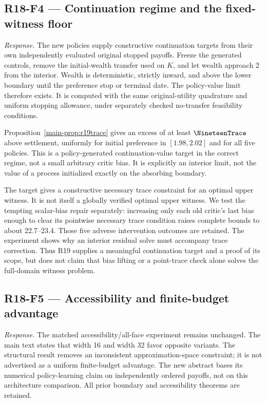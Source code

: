 \subsection{R18-F4 --- Continuation regime and the fixed-witness floor}
\emph{Response.} The new policies supply constructive continuation targets from their own independently evaluated original stopped payoffs. Freeze the generated controls, remove the initial-wealth transfer used on $K$, and let wealth approach 2 from the interior. Wealth is deterministic, strictly inward, and above the lower boundary until the preference stop or terminal date. The policy-value limit therefore exists. It is computed with the same original-utility quadrature and uniform stopping allowance, under separately checked no-transfer feasibility conditions.

Proposition~\ref{main-prop:r19trace} gives an excess of at least $\NineteenTrace$ above settlement, uniformly for initial preference in $[1.98,2.02]$ and for all five policies. This is a policy-generated continuation-value target in the correct regime, not a small arbitrary critic bias. It is explicitly an interior limit, not the value of a process initialized exactly on the absorbing boundary.

The target gives a constructive necessary trace constraint for an optimal upper witness. It is not itself a globally verified optimal upper witness. We test the tempting scalar-bias repair separately: increasing only each old critic's last bias enough to clear its pointwise necessary trace condition raises complete bounds to about 22.7--23.4. Those five adverse intervention outcomes are retained. The experiment shows why an interior residual solve must accompany trace correction. Thus R19 supplies a meaningful continuation target and a proof of its scope, but does not claim that bias lifting or a point-trace check alone solves the full-domain witness problem.

\subsection{R18-F5 --- Accessibility and finite-budget advantage}
\emph{Response.} The matched accessibility/all-face experiment remains unchanged. The main text states that width 16 and width 32 favor opposite variants. The structural result removes an inconsistent approximation-space constraint; it is not advertised as a uniform finite-budget advantage. The new abstract bases its numerical policy-learning claim on independently ordered payoffs, not on this architecture comparison. All prior boundary and accessibility theorems are retained.

